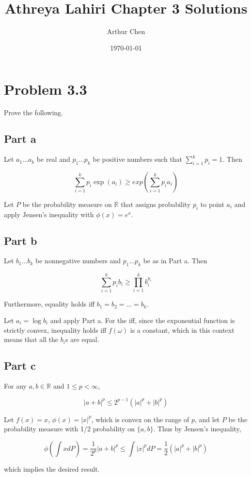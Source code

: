 \documentclass{article}
\author{Arthur Chen}
\title{Athreya Lahiri Chapter 3 Solutions}
\date{\today}
\newcommand{\R}{\mathbb{R}}
\begin{document}
\maketitle

\section*{Problem 3.3}

Prove the following.

\subsection*{Part a}

Let $a_1 \dots a_k$ be real and $p_1 \dots p_k$ be positive numbers such that $\sum_{i=1}^kp_i = 1$. Then

\[
\sum_{i=1}^kp_i\exp(a_i) \geq exp\left( \sum_{i=1}^kp_ia_i \right)
\]

Let $P$ be the probability measure on $\R$ that assigns probability $p_i$ to point $a_i$ and apply Jensen's inequality with $\phi(x) = e^x$.

\subsection*{Part b}

Let $b_1 \dots b_k$ be nonnegative numbers and $p_1 \dots p_k$ be as in Part a. Then

\[
\sum_{i=1}^k p_ib_i \geq \prod_{i=1}^k b_i^{p_i}
\]

Furthermore, equality holds iff $b_1 = b_2 = \dots = b_k$.

Let $a_i = \log b_i$ and apply Part a. For the iff, since the exponential function is strictly convex, inequality holds iff $f(\omega)$ is a constant, which in this context means that all the $b_i$s are equal.

\subsection*{Part c}

For any $a, b \in \R$ and $1 \leq p < \infty$,

\[
|a+b|^p \leq 2^{p-1}(|a|^p + |b|^p)
\]

Let $f(x) = x$, $\phi(x) = |x|^p$, which is convex on the range of $p$, and let $P$ be the probability measure with 1/2 probability on $\{a, b\}$. Thus by Jensen's inequality,

\[
\phi\left( \int xdP \right) = \frac{1}{2^p}|a+b|^p \leq \int |x|^pdP = \frac{1}{2}(|a|^p + |b|^p)
\]

which implies the desired result.
\end{document}
